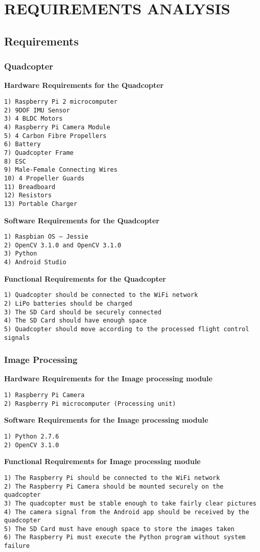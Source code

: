 
\chapter{REQUIREMENTS ANALYSIS} %

\section{Requirements}
\subsection{Quadcopter}
\textbf{Hardware Requirements for the Quadcopter}
\begin{verbatim}
1) Raspberry Pi 2 microcomputer
2) 9DOF IMU Sensor
3) 4 BLDC Motors
4) Raspberry Pi Camera Module
5) 4 Carbon Fibre Propellers
6) Battery
7) Quadcopter Frame
8) ESC
9) Male-Female Connecting Wires
10) 4 Propeller Guards
11) Breadboard
12) Resistors
13) Portable Charger
\end{verbatim}
\textbf{Software Requirements for the Quadcopter}
\begin{verbatim}
1) Raspbian OS – Jessie
2) OpenCV 3.1.0 and OpenCV 3.1.0
3) Python
4) Android Studio
\end{verbatim}
\textbf{Functional Requirements for the Quadcopter}
\begin{verbatim}
1) Quadcopter should be connected to the WiFi network
2) LiPo batteries should be charged
3) The SD Card should be securely connected
4) The SD Card should have enough space
5) Quadcopter should move according to the processed flight control signals
\end{verbatim}
\subsection{Image Processing}
\textbf{Hardware Requirements for the Image processing module}
\begin{verbatim}
1) Raspberry Pi Camera
2) Raspberry Pi microcomputer (Processing unit)
\end{verbatim}
\textbf{Software Requirements for the Image processing module}
\begin{verbatim}
1) Python 2.7.6
2) OpenCV 3.1.0
\end{verbatim}
\textbf{Functional Requirements for Image processing module}
\begin{verbatim}
1) The Raspberry Pi should be connected to the WiFi network
2) The Raspberry Pi Camera should be mounted securely on the quadcopter
3) The quadcopter must be stable enough to take fairly clear pictures
4) The camera signal from the Android app should be received by the quadcopter
5) The SD Card must have enough space to store the images taken
6) The Raspberry Pi must execute the Python program without system failure
\end{verbatim}
